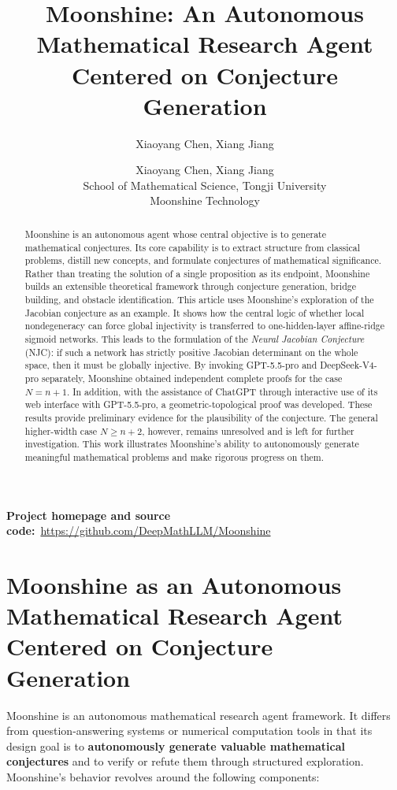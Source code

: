 \documentclass[a4paper,11pt]{article}
\title{Moonshine: An Autonomous Mathematical Research Agent Centered on Conjecture Generation}
\author{Xiaoyang Chen, Xiang Jiang}
\date{}
\author{
	Xiaoyang Chen, Xiang Jiang\\
	School of Mathematical Science, Tongji University\\
	Moonshine Technology
}
\theoremstyle{plain}
\theoremstyle{definition}
\theoremstyle{remark}
\begin{document}
\maketitle
\begin{center}
\small\textbf{Project homepage and source code:}\ \url{https://github.com/DeepMathLLM/Moonshine}
\end{center}

\begin{abstract}
Moonshine is an autonomous agent whose central objective is to generate mathematical conjectures. Its core capability is to extract structure from classical problems, distill new concepts, and formulate conjectures of mathematical significance. Rather than treating the solution of a single proposition as its endpoint, Moonshine builds an extensible theoretical framework through conjecture generation, bridge building, and obstacle identification. This article uses Moonshine's exploration of the Jacobian conjecture as an example. It shows how the central logic of whether local nondegeneracy can force global injectivity is transferred to one-hidden-layer affine-ridge sigmoid networks. This leads to the formulation of the \emph{Neural Jacobian Conjecture} (NJC): if such a network has strictly positive Jacobian determinant on the whole space, then it must be globally injective. By invoking GPT-5.5-pro and DeepSeek-V4-pro separately, Moonshine obtained independent complete proofs for the case \(N=n+1\). In addition, with the assistance of ChatGPT through interactive use of its web interface with GPT-5.5-pro, a geometric-topological proof was developed. These results provide preliminary evidence for the plausibility of the conjecture. The general higher-width case \(N\ge n+2\), however, remains unresolved and is left for further investigation. This work illustrates Moonshine's ability to autonomously generate meaningful mathematical problems and make rigorous progress on them.
\end{abstract}


\section{Moonshine as an Autonomous Mathematical Research Agent Centered on Conjecture Generation}

Moonshine is an autonomous mathematical research agent framework. It differs from question-answering systems or numerical computation tools in that its design goal is to \textbf{autonomously generate valuable mathematical conjectures} and to verify or refute them through structured exploration. Moonshine's behavior revolves around the following components:
\end{document}
